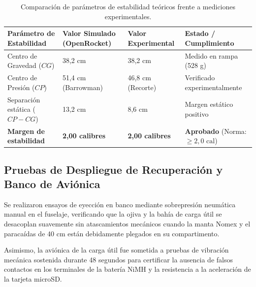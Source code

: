 \begin{table}[H]
\centering
\small
\begin{tabularx}{\linewidth}{p{4.2cm}p{3.6cm}p{3.4cm}X}
\toprule
\rowcolor{navyiejaga!15}
\textbf{Parámetro de Estabilidad} & \textbf{Valor Simulado (OpenRocket)} & \textbf{Valor Experimental} & \textbf{Estado / Cumplimiento} \\
\midrule
Centro de Gravedad ($CG$) & 38,2 cm & 38,2 cm & Medido en rampa (528 g) \\
\rowcolor{grisclaro}
Centro de Presión ($CP$) & 51,4 cm (Barrowman) & 46,8 cm (Recorte) & Verificado experimentalmente \\
Separación estática ($CP - CG$) & 13,2 cm & 8,6 cm & Margen estático positivo \\
\rowcolor{grisclaro}
\textbf{Margen de estabilidad} & \textbf{2,00 calibres} & \textbf{2,00 calibres} & \textbf{Aprobado} (Norma: $\ge 2,0\text{ cal}$) \\
\bottomrule
\end{tabularx}
\caption{Comparación de parámetros de estabilidad teóricos frente a mediciones experimentales.}
\label{tab:comparacion_estabilidad}
\end{table}

\subsection{Pruebas de Despliegue de Recuperación y Banco de Aviónica}
Se realizaron ensayos de eyección en banco mediante sobrepresión neumática manual en el fuselaje, verificando que la ojiva y la bahía de carga útil se desacoplan suavemente sin atascamientos mecánicos cuando la manta Nomex y el paracaídas de 40 cm están debidamente plegados en su compartimento.

Asimismo, la aviónica de la carga útil fue sometida a pruebas de vibración mecánica sostenida durante 48 segundos para certificar la ausencia de falsos contactos en los terminales de la batería NiMH y la resistencia a la aceleración de la tarjeta microSD.

